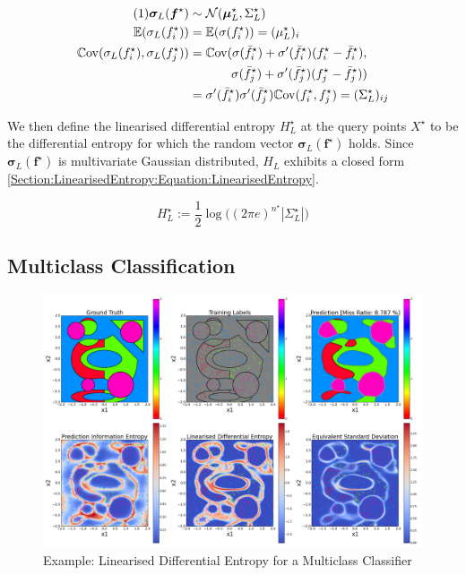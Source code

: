 \documentclass{article}
\renewcommand{\vec}[1]{\boldsymbol{#1}}
\newcommand\numberthis{\addtocounter{equation}{1}\tag{\theequation}}
\begin{document}
			\begin{align*}
			\numberthis \label{Section:LinearisedEntropy:Equation:MomentsLinearisedSigmoid}
					\vec{\sigma}_{L}(\vec{f}^{\star}) & \sim \mathcal{N}(\vec{\mu}^{\star}_{L}, \Sigma^{\star}_{L}) \\
					\mathbb{E}(\sigma_{L}(f^{\star}_{i})) & = \mathbb{E}(\sigma(f^{\star}_{i})) = ({\mu^{\star}_{L}})_{i} \\
					\mathbb{C}\mathrm{ov}(\sigma_{L}(f^{\star}_{i}), \sigma_{L}(f^{\star}_{j})) & =  \mathbb{C}\mathrm{ov}(\sigma(\bar{f}^{\star}_{i}) + \sigma'(\bar{f}^{\star}_{i}) (f^{\star}_{i} - \bar{f}^{\star}_{i}),\\ 
					& \qquad \;\;\;\;\; \sigma(\bar{f}^{\star}_{j}) + \sigma'(\bar{f}^{\star}_{j}) (f^{\star}_{j} - \bar{f}^{\star}_{j})) \\
					& = \sigma'(\bar{f}^{\star}_{i}) \sigma'(\bar{f}^{\star}_{j}) \mathbb{C}\mathrm{ov}(f^{\star}_{i}, f^{\star}_{j}) = ({\Sigma^{\star}_{L}})_{ij}			
			\end{align*}
			
			We then define the linearised differential entropy $H^{\star}_{L}$ at the query points $X^{\star}$ to be the differential entropy for which the random vector $\vec{\sigma}_{L}(\vec{f}^{\star})$ holds. Since $\vec{\sigma}_{L}(\vec{f}^{\star})$ is multivariate Gaussian distributed, $H_{L}$ exhibits a closed form \eqref{Section:LinearisedEntropy:Equation:LinearisedEntropy}.
			
			\begin{equation}
				H^{\star}_{L} := \frac{1}{2} \log\Big((2 \pi e)^{n^{\star}} |\Sigma^{\star}_{L}|\Big)
			\label{Section:LinearisedEntropy:Equation:LinearisedEntropy}
			\end{equation}			


					
	\subsection{Multiclass Classification}
	
		\begin{figure}[tb]
		\centering
			\includegraphics[width = \linewidth]{Figures/multiclass_linearised_entropy/Figure1.png}
		\caption{Example: Linearised Differential Entropy for a Multiclass Classifier}
		\label{Figure:Results:MulticlassLinearisedEntropy}
		\end{figure}
			
\end{document}
